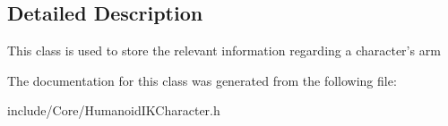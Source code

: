 \subsection{Detailed Description}
This class is used to store the relevant information regarding a character's arm 

The documentation for this class was generated from the following file:\begin{DoxyCompactItemize}
\item 
include/Core/HumanoidIKCharacter.h\end{DoxyCompactItemize}
